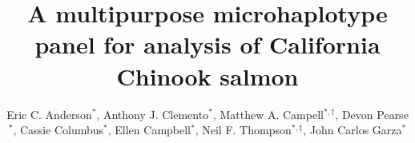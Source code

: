 

\newcommand{\myTitle}{A multipurpose microhaplotype panel for analysis of California Chinook salmon}
\title{\myTitle}

\newcommand{\myAuthors}{Eric C. Anderson$^{*,\S}$, Anthony J. Clemento$^{*}$, Matthew A. Campell$^{*,\dagger}$, Devon Pearse$^{*}$, Cassie Columbus$^{*}$, Ellen Campbell$^{*}$, Neil F. Thompson$^{*,\ddag}$, John Carlos Garza$^{*}$}
\author{Eric C. Anderson$^{*}$, Anthony J. Clemento$^{*}$, Matthew A. Campell$^{*,\dagger}$, Devon Pearse$^{*}$, Cassie Columbus$^{*}$, Ellen Campbell$^{*}$, Neil F. Thompson$^{*,\ddag}$, John Carlos Garza$^{*}$}


\newcommand{\myAffiliations}{
$^*$Southwest Fisheries Science Center, National Marine Fisheries Service, NOAA, Santa Cruz, California, USA. $^\dagger$Current address: Mac's home address in AK. $^\ddag$Current address: Get Neil's address.
}

\renewcommand{\AuthorAddresses}{\myAffiliations}

\renewcommand{\KeyWords}{Genetic stock identfication, population assignment, parentage based tagging, amplicon sequencing}

\renewcommand{\CorrespondingAuthor}{eric.c.anderson@noaa.gov}


\newcommand{\myEmailAddress}{eric.c.anderson@noaa.gov}
\newcommand{\myEmailFootnote}{$^\S$}

\newcommand{\myCopyright}{\copyright US Federal Government work in the public domain in the USA}

\newcommand{\myRunningTitle}{Microhaplotypes for California Chinook salmon}
\renewcommand{\RunningTitle}{\myRunningTitle}

\newcommand{\myRunningAuthor}{Anderson et al.}

